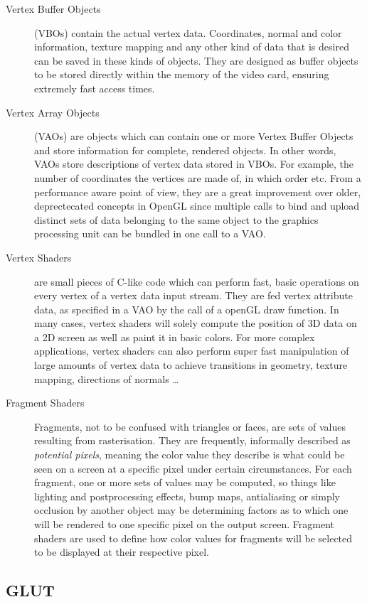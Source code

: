 \begin{description}
	\item[Vertex Buffer Objects] (VBOs) contain the actual vertex data. Coordinates, normal and color information, texture mapping and any other kind of data that is desired can be saved in these kinds of objects. They are designed as buffer objects to be stored directly within the memory of the video card, ensuring extremely fast access times.
	\item[Vertex Array Objects] (VAOs) are objects which can contain one or more Vertex Buffer Objects and store information for complete, rendered objects. In other words, VAOs store descriptions of vertex data stored in VBOs. For example, the number of coordinates the vertices are made of, in which order etc. From a performance aware point of view, they are a great improvement over older, deprectecated concepts in OpenGL since multiple calls to bind and upload distinct sets of data belonging to the same object to the graphics processing unit can be bundled in one call to a VAO.
	\item[Vertex Shaders] are small pieces of C-like code which can perform fast, basic operations on every vertex of a vertex data input stream. They are fed vertex attribute data, as specified in a VAO by the call of a openGL draw function. In many cases, vertex shaders will solely compute the position of 3D data on a 2D screen as well as paint it in basic colors. For more complex applications, vertex shaders can also perform super fast manipulation of large amounts of vertex data to achieve transitions in geometry, texture mapping, directions of normals \dots
	\item[Fragment Shaders] Fragments, not to be confused with triangles or faces, are sets of values resulting from rasterisation. They are frequently, informally described as \textit{potential pixels}, meaning the color value they describe is what could be seen on a screen at a specific pixel under certain circumstances. For each fragment, one or more sets of values may be computed, so things like lighting and postprocessing effects, bump maps, antialiasing or simply occlusion by another object may be determining factors as to which one will be rendered to one specific pixel on the output screen. Fragment shaders are used to define how color values for fragments will be selected to be displayed at their respective pixel.
\end{description}

\subsection{GLUT}
\label{sec:glut}

